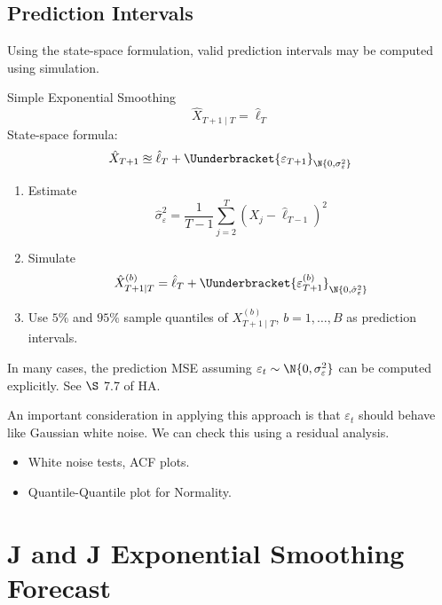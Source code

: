 \subsection*{Prediction Intervals}
Using the state-space formulation, valid prediction intervals
may be computed using simulation.
\begin{Example}{Simple Exponential Smoothing}{}
    \[ \hat{X}_{T+1\mid T}=\hat{\ell}_T \]
    State-space formula:
    \[ \hat{X}_{T+1}\approxeq \hat{\ell}_T+\Uunderbracket{\varepsilon_{T+1}}_{\N{0,\sigma_\varepsilon^2}} \]
    \begin{enumerate}[(1)]
        \item Estimate
              \[ \hat{\sigma}_{\varepsilon}^2=\frac{1}{T-1} \sum_{j=2}^{T} (X_j-\hat{\ell}_{T-1})^2 \]
        \item Simulate
              \[ \hat{X}_{T+1\mid T}^{(b)}=\hat{\ell}_T+\Uunderbracket{\varepsilon_{T+1}^{(b)}}_{\N{0,\hat{\sigma}_\varepsilon^2}} \]
        \item Use $ 5\% $ and $ 95\% $ sample quantiles of $ X_{T+1\mid T}^{(b)} $, $ b=1,\ldots,B $
              as prediction intervals.
    \end{enumerate}
\end{Example}
\begin{Remark}{}{}
    In many cases, the prediction MSE assuming $ \varepsilon_t \sim \N{0,\sigma_{\varepsilon}^2} $
    can be computed explicitly. See $ \S $ 7.7 of HA\@.
\end{Remark}
An important consideration in applying this approach is that $ \varepsilon_t $
should behave like Gaussian white noise. We can check this using a residual analysis.
\begin{itemize}
    \item White noise tests, ACF plots.
    \item Quantile-Quantile plot for Normality.
\end{itemize}
\section{J and J Exponential Smoothing Forecast}
